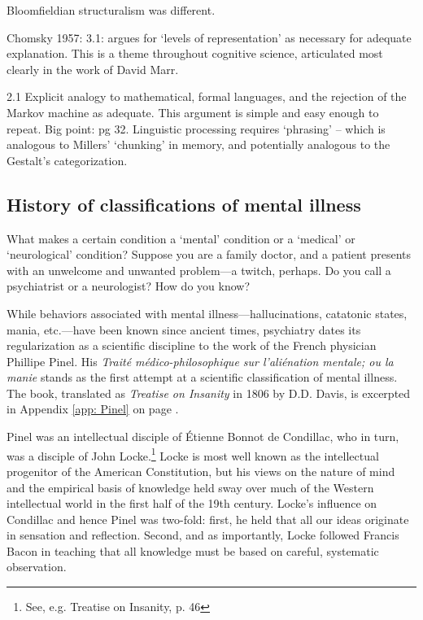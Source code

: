 Bloomfieldian structuralism was different.

Chomsky 1957:
3.1: argues for `levels of representation' as necessary for adequate explanation. This is a theme throughout cognitive science, articulated most clearly in the work of David Marr.

2.1 Explicit analogy to mathematical, formal languages, and the rejection of the Markov machine as adequate. This argument is simple and easy enough to repeat.
 Big point: pg 32. Linguistic processing requires `phrasing' – which is analogous to Millers' `chunking' in memory, and potentially analogous to the Gestalt's categorization.

\subsection{History of classifications of mental illness}
\label{historyofclassificationsofmentalillness}

What makes a certain condition a `mental' condition or a `medical' or `neurological' condition? Suppose you are a family doctor, and a patient presents with an unwelcome and unwanted problem---a twitch, perhaps. Do you call a psychiatrist or a neurologist? How do you know?

While behaviors associated with mental illness---hallucinations, catatonic states, mania, etc.---have been known since ancient times, psychiatry dates its regularization as a scientific discipline to the work of the French physician Phillipe Pinel. His \emph{Traité médico-philosophique sur l'aliénation mentale; ou la manie} stands as the first attempt at a scientific classification of mental illness. The book, translated as \emph{Treatise on Insanity} in 1806 by D.D. Davis, is excerpted in Appendix \ref{app: Pinel} on page \pageref{app: Pinel}. 

Pinel was an intellectual disciple of Étienne Bonnot de Condillac, who in turn, was a disciple of John Locke.\footnote{See, e.g. Treatise on Insanity, p. 46} Locke is most well known as the intellectual progenitor of the American Constitution, but his views on the nature of mind and the empirical basis of knowledge held sway over much of the Western intellectual world in the first half of the 19th century. Locke's influence on Condillac and hence Pinel was two-fold: first, he held that all our ideas originate in sensation and reflection. Second, and as importantly, Locke followed Francis Bacon in teaching that all knowledge must be based on careful, systematic observation.

